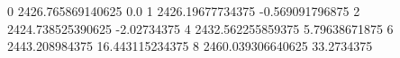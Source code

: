 0 2426.765869140625 0.0
1 2426.19677734375 -0.569091796875
2 2424.738525390625 -2.02734375
4 2432.562255859375 5.79638671875
6 2443.208984375 16.443115234375
8 2460.039306640625 33.2734375
